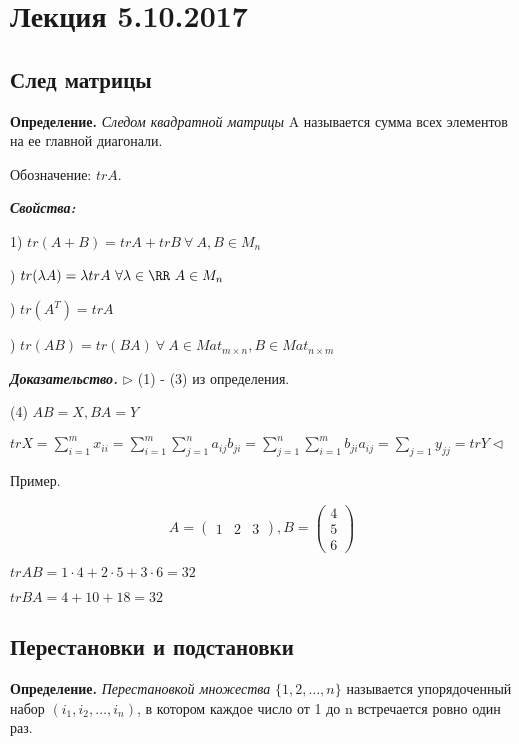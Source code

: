 \section{Лекция 5.10.2017}

\subsection{След матрицы}

\textbf{Определение.} \textit{Следом квадратной матрицы} A называется сумма всех элементов на ее главной диагонали.

Обозначение: $trA$.

\bigskip
\textbf{\textit{Свойства:}}

1) $tr(A + B) = trA + trB \ \forall \ A, B \in M_n$

) $tr(\lambda A) = \lambda trA \ \forall \lambda \in \RR \ A \in M_n$

) $tr(A^T) = trA$

) $tr(AB) = tr(BA) \ \forall \ A \in Mat_{m \times n}, B \in Mat_{n \times m}$

\bigskip
\textbf{\textit{Доказательство.}} $\rhd$ (1) - (3) из определения.

(4) $AB = X, BA = Y$

$trX = \sum\limits_{i = 1}^m x_{ii} = \sum\limits_{i = 1}^m \sum\limits_{j = 1}^n a_{ij} b_{ji} = \sum\limits_{j = 1}^n \sum\limits_{i = 1}^m b_{ji} a_{ij} = \sum\limits_{j = 1} y_{jj} = trY \lhd$

\bigskip
Пример.

\begin{equation*}A = \begin{pmatrix} 1 & 2 & 3 \end{pmatrix}, B = \begin{pmatrix} 4 \\ 5 \\ 6 \end{pmatrix} \end{equation*}

$trAB = 1 \cdot 4 + 2 \cdot 5 + 3 \cdot 6 = 32$

$trBA = 4 + 10 + 18 = 32$

\subsection{Перестановки и подстановки}

\textbf{Определение.} \textit{Перестановкой множества} $\{ 1, 2, \dots, n \} $ называется упорядоченный набор $(i_1, i_2, \dots, i_n)$, в котором каждое число от 1 до n встречается ровно один раз.

